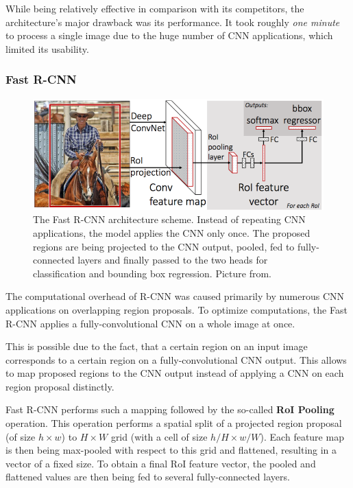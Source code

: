 \documentclass[thesis=B,english]{FITthesis}[2019/12/23]
\begin{document}
While being relatively effective in comparison with its competitors, the architecture's major drawback was its performance. It took roughly \textit{one minute} to process a single image due to the huge number of CNN applications, which limited its usability.

\subsubsection{Fast R-CNN}

\begin{figure}[h]
	\centering
	\includegraphics[scale=0.5]{images/fast_rcnn.png}
	\caption{The Fast R-CNN architecture scheme. Instead of repeating CNN applications, the model applies the CNN only once. The proposed regions are being projected to the CNN output, pooled, fed to fully-connected layers and finally passed to the two heads for classification and bounding box regression. Picture from\cite{fast_rcnn}.}
\end{figure}

The computational overhead of R-CNN was caused primarily by numerous CNN applications on overlapping region proposals. To optimize computations, the Fast R-CNN\cite{fast_rcnn} applies a fully-convolutional CNN on a whole image at once.

This is possible due to the fact, that a certain region on an input image corresponds to a certain region on a fully-convolutional CNN output. This allows to map proposed regions to the CNN output instead of applying a CNN on each region proposal distinctly.

Fast R-CNN performs such a mapping followed by the so-called \textbf{RoI Pooling} operation. This operation performs a spatial split of a projected region proposal (of size $h \times w$) to $H \times W$ grid (with a cell of size  $h/H \times w/W$). Each feature map is then being max-pooled with respect to this grid and flattened, resulting in a vector of a fixed size. To obtain a final RoI feature vector, the pooled and flattened values are then being fed to several fully-connected layers.
\end{document}
